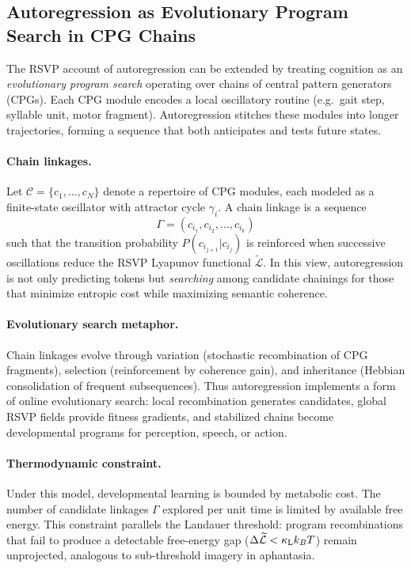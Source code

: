\documentclass[a4paper,11pt]{article}
\begin{document}
\subsection{Autoregression as Evolutionary Program Search in CPG Chains}

The RSVP account of autoregression can be extended by treating cognition as an
\emph{evolutionary program search} operating over chains of central pattern
generators (CPGs). Each CPG module encodes a local oscillatory routine
(e.g.\ gait step, syllable unit, motor fragment). Autoregression stitches these
modules into longer trajectories, forming a sequence that both anticipates and
tests future states.

\paragraph{Chain linkages.}
Let $\mathcal{C}=\{c_1,\dots,c_N\}$ denote a repertoire of CPG modules, each
modeled as a finite-state oscillator with attractor cycle $\gamma_i$. A chain
linkage is a sequence
\[
\Gamma=(c_{i_1},c_{i_2},\dots,c_{i_k})
\]
such that the transition probability $P(c_{i_{j+1}}|c_{i_j})$ is reinforced
when successive oscillations reduce the RSVP Lyapunov functional
$\widetilde{\mathcal{L}}$. In this view, autoregression is not only predicting
tokens but \emph{searching} among candidate chainings for those that minimize
entropic cost while maximizing semantic coherence.

\paragraph{Evolutionary search metaphor.}
Chain linkages evolve through variation (stochastic recombination of CPG
fragments), selection (reinforcement by coherence gain), and inheritance
(Hebbian consolidation of frequent subsequences). Thus autoregression
implements a form of online evolutionary search: local recombination generates
candidates, global RSVP fields provide fitness gradients, and stabilized
chains become developmental programs for perception, speech, or action.

\paragraph{Thermodynamic constraint.}
Under this model, developmental learning is bounded by metabolic cost. The
number of candidate linkages $\Gamma$ explored per unit time is limited by
available free energy. This constraint parallels the Landauer threshold:
program recombinations that fail to produce a detectable free-energy gap
($\Delta\widetilde{\mathcal{L}} < \kappa_{\rm L} k_B T$) remain unprojected,
analogous to sub-threshold imagery in aphantasia.
\end{document}
